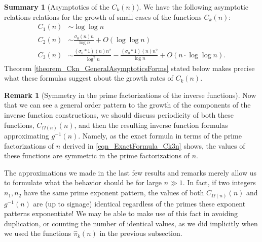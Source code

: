 \documentclass[11pt,reqno,a4letter]{article}
\numberwithin{figure}{section}
\numberwithin{table}{section}
\theoremstyle{plain}
\numberwithin{theorem}{section}
\theoremstyle{definition}
\newtheorem{remark}[theorem]{Remark}
\newtheorem{summary}[theorem]{Summary}
\begin{document}
\begin{summary}[Asymptotics of the $C_k(n)$]
We have the following asymptotic relations relations for the growth of small cases of 
the functions $C_k(n)$: 
\begin{align*} 
C_1(n) & \sim \log\log n \\ 
C_2(n) & \sim \frac{\sigma_0(n) n}{\log n} + O(\log\log n) \\ 
C_3(n) & \sim \frac{(\sigma_0 \ast 1)(n) n^2}{\log^2 n} - 
     \frac{(\sigma_0 \ast 1)(n) n^2}{\log n} + 
     O\left(n \cdot \log\log n\right). 
\end{align*} 
Theorem \ref{theorem_Ckn_GeneralAsymptoticsForms} stated below 
makes precise what these formulas suggest about the growth rates of 
$C_k(n)$. 
\end{summary} 

\begin{remark}[Symmetry in the prime factorizations of the inverse functions] 
Now that we can see a general order pattern to the growth of the components of 
the inverse function constructions, we should discuss periodicity of both these 
functions, $C_{\Omega(n)}(n)$, and then the resulting inverse function formulas  
approximating $g^{-1}(n)$. Namely, as the exact formula in terms of the prime 
factorizations of $n$ derived in \eqref{eqn_ExactFormula_Ck3n} shows, the values of 
these functions are symmetric in the prime factorizations of $n$. 

The approximations 
we made in the last few results and remarks merely allow us to formulate what the 
behavior should be for large $n \gg 1$. In fact, if two integers $n_1, n_2$ have the 
same prime exponent pattern, the values of both $C_{\Omega(n)}(n)$ and 
$g^{-1}(n)$ are (up to signage) identical regardless of the primes these exponent 
patterns exponentiate! We may be able to make use of this fact in avoiding duplication, 
or counting the number of identical values, as we did implicitly when we used the 
functions $\widehat{\pi}_k(n)$ in the previous subsection. 
\end{remark}
\end{document}
